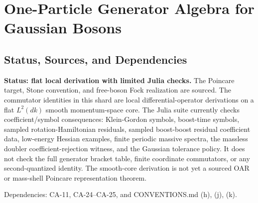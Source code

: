 
\section{One-Particle Generator Algebra for Gaussian Bosons}
\label{sec:gaussian-boson-generator-algebra}

\subsection{Status, Sources, and Dependencies}

\textbf{Status: flat local derivation with limited Julia checks.}  The Poincare
target, Stone convention, and free-boson Fock realization are sourced.  The
commutator identities in this shard are local differential-operator derivations
on a flat \(L^2(dk)\) smooth momentum-space core.  The Julia suite currently
checks coefficient/symbol consequences: Klein-Gordon symbols, boost-time
symbols, sampled rotation-Hamiltonian residuals, sampled boost-boost residual
coefficient data, low-energy Hessian examples, finite periodic massive spectra,
the massless doubler coefficient-rejection witness, and the Gaussian tolerance
policy.  It does not check the full generator bracket table, finite coordinate
commutators, or any second-quantized identity.  The smooth-core derivation is
not yet a sourced OAR or mass-shell Poincare representation theorem.

Dependencies: CA-11, CA-24--CA-25, and CONVENTIONS.md (h), (j), (k).


